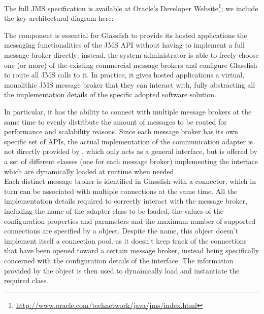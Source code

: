 The full JMS specification is available at Oracle's Developer Website\footnote{\url{http://www.oracle.com/technetwork/java/jms/index.html}}; we include the key architectural diagram here: 
\begin{figure}[H]
\centering
{}
\end{figure}

The  component is essential for Glassfish to provide its hosted applications the messaging functionalities of the JMS API without having to implement a full message broker directly; instead, the system administrator is able to freely choose one (or more) of the existing commercial message brokers and configure Glassfish to route all JMS calls to it. In practice, it gives hosted applications a virtual, monolithic JMS message broker that they can interact with, fully abstracting all the implementation details of the specific adopted software solution.

In particular, it has the ability to connect with multiple message brokers at the same time to evenly distribute the amount of messages to be routed for performance and scalability reasons. Since each message broker has its own specific set of APIs, the actual implementation of the communication adapter is not directly provided by , which only acts as a general interface, but is offered by a set of different classes (one for each message broker) implementing the  interface which are dynamically loaded at runtime when needed.\\

Each distinct message broker is identified in Glassfish with a connector, which in turn can be associated with multiple connections at the same time. All the implementation details required to correctly interact with the message broker, including the name of the adapter class to be loaded, the values of the configuration properties and parameters and the maximum number of supported connections are specified by a  object. Despite the name, this object doesn't implement itself a connection pool, as it doesn't keep track of the connections that have been opened toward a certain message broker, instead being specifically concerned with the configuration details of the interface. The information provided by the  object is then used to dynamically load and instantiate the required  class.\\

